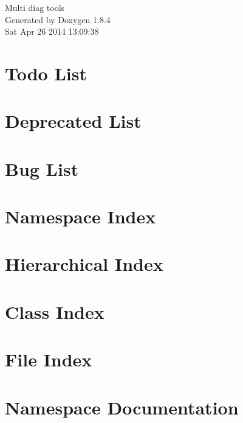 \documentclass[twoside]{book}
\newcommand{\clearemptydoublepage}{%
  \newpage{\pagestyle{empty}\cleardoublepage}%
}
\begin{document}
\hypersetup{pageanchor=false}
\begin{titlepage}
\vspace*{7cm}
\begin{center}%
{\Large Multi diag tools }\\
\vspace*{1cm}
{\large Generated by Doxygen 1.8.4}\\
\vspace*{0.5cm}
{\small Sat Apr 26 2014 13:09:38}\\
\end{center}
\end{titlepage}
\clearemptydoublepage
\tableofcontents
\clearemptydoublepage
{}
\hypersetup{pageanchor=true}

\chapter{Todo List}
\label{todo}
\hypertarget{todo}{}

\chapter{Deprecated List}
\label{deprecated}
\hypertarget{deprecated}{}

\chapter{Bug List}
\label{bug}
\hypertarget{bug}{}

\chapter{Namespace Index}

\chapter{Hierarchical Index}

\chapter{Class Index}

\chapter{File Index}

\chapter{Namespace Documentation}



\end{document}
